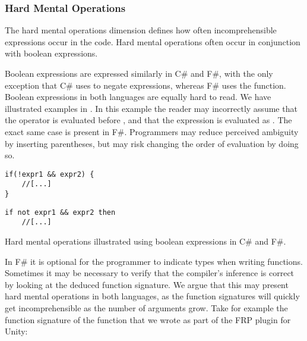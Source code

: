 \subsubsection{Hard Mental Operations}
The hard mental operations dimension defines how often incomprehensible expressions occur in the code. Hard mental operations often occur in conjunction with boolean expressions\cite{green1996usability}.

Boolean expressions are expressed similarly in C\# and F\#, with the only exception that C\# uses \ttt{!} to negate expressions, whereas F\# uses the  function. Boolean expressions in both languages are equally hard to read. We have illustrated examples in . In this example the reader may incorrectly assume that the \ttt{\&\&} operator is evaluated before \ttt{!}, and that the expression is evaluated as . The exact same case is present in F\#. Programmers may reduce perceived ambiguity by inserting parentheses, but may risk changing the order of evaluation by doing so.

\begin{listing}[H]
    \begin{minipage}{.45\textwidth}
        \begin{verbatim}
if(!expr1 && expr2) {
    //[...]
}
        \end{verbatim}
    \end{minipage}
    \hfill
    \begin{minipage}{.45\textwidth}
        \begin{verbatim}
if not expr1 && expr2 then
    //[...]
        \end{verbatim}
    \end{minipage}
\caption{Hard mental operations illustrated using boolean expressions in C\# and F\#.}
\label{lst:hard:mental:operations}
\end{listing}

In F\# it is optional for the programmer to indicate types when writing functions. Sometimes it may be necessary to verify that the compiler's inference is correct by looking at the deduced function signature. We argue that this may present hard mental operations in both languages, as the function signatures will quickly get incomprehensible as the number of arguments grow. Take for example the function signature of the  function that we wrote as part of the \gls{FRP} plugin for Unity:

